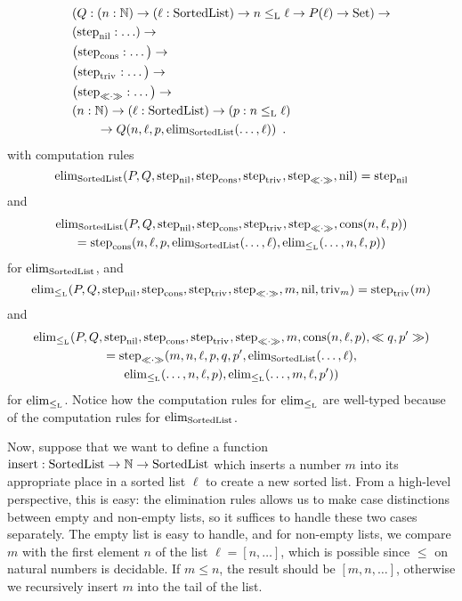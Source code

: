 \documentclass{article}
\begin{document}
\begin{example}
\begin{align*}
                       & (Q : (n : \Nat) \to (\ell : \SortedList) \to n \lessList \ell \to P(\ell) \to \Set) \to \\
                       & (\stepind{\nilList} : \ldots) \to \\
                       & \big(\stepind{\consListbare} : \ldots\big) \to \\
                       & \big(\stepind{\nilLess{}} : \ldots\big) \to \\
                       & \big(\stepind{\consLessbare} : \ldots\big) \to \\
                       & (n : \Nat) \to (\ell : \SortedList) \to (p : n \lessList \ell) \\
                       & \qquad \to Q(n, \ell, p, \elim_{\SortedList}(\ldots, \ell)) \enspace .
  \end{align*}
with computation rules
%
\[
\elim_{\SortedList}(P, Q, \stepind{\nilList}, \stepind{\consListbare}, \stepind{\nilLess{}}, \stepind{\consLessbare}, \nilList) = \stepind{\nilList}
\]
and
\begin{multline*}
\elim_{\SortedList}(P, Q, \stepind{\nilList}, \stepind{\consListbare}, \stepind{\nilLess{}}, \stepind{\consLessbare}, \consList{n}{\ell}{p}) \\
= \stepind{\consListbare}(n, \ell, p, \elim_{\SortedList}(\ldots, \ell), 
\elim_{\lessList}(\ldots, n, \ell, p))  
\end{multline*}
%
for $\elim_{\SortedList}$, and
\[
\elim_{\lessList}(P, Q, \stepind{\nilList}, \stepind{\consListbare}, \stepind{\nilLess{}}, \stepind{\consLessbare}, m, \nilList, \nilLess{m}) = \stepind{\nilLess{}}(m)
\]
and
\begin{multline*}
\elim_{\lessList}(P, Q, \stepind{\nilList}, \stepind{\consListbare}, \stepind{\nilLess{}}, \stepind{\consLessbare}, m, \consList{n}{\ell}{p}, \consLess{m}{n}{\ell}{p}{q}{p'}) \\
= \stepind{\consLessbare}(m, n, \ell, p, q, p', \elim_{\SortedList}(\ldots, \ell), \\
\elim_{\lessList}(\ldots, n, \ell, p), \elim_{\lessList}(\ldots, m, \ell, p'))
\end{multline*}
for $\elim_{\lessList}$. Notice how the computation rules for
$\elim_{\lessList}$ are well-typed because of the computation rules
for $\elim_{\SortedList}$.

Now, suppose that we want to define a function $\Listinsert :
\SortedList \to \Nat \to \SortedList$ which inserts a number $m$ into
its appropriate place in a sorted list $\ell$ to create a new sorted
list. From a high-level perspective, this is easy: the elimination
rules allows us to make case distinctions between empty and non-empty
lists, so it suffices to handle these two cases separately. The empty
list is easy to handle, and for non-empty lists, we compare $m$ with
the first element $n$ of the list $\ell = [n, \ldots]$, which is
possible since $\leq$ on natural numbers is decidable. If $m \leq n$,
the result should be $[m, n, \ldots]$, otherwise we recursively insert
$m$ into the tail of the list.


\end{example}
\end{document}
